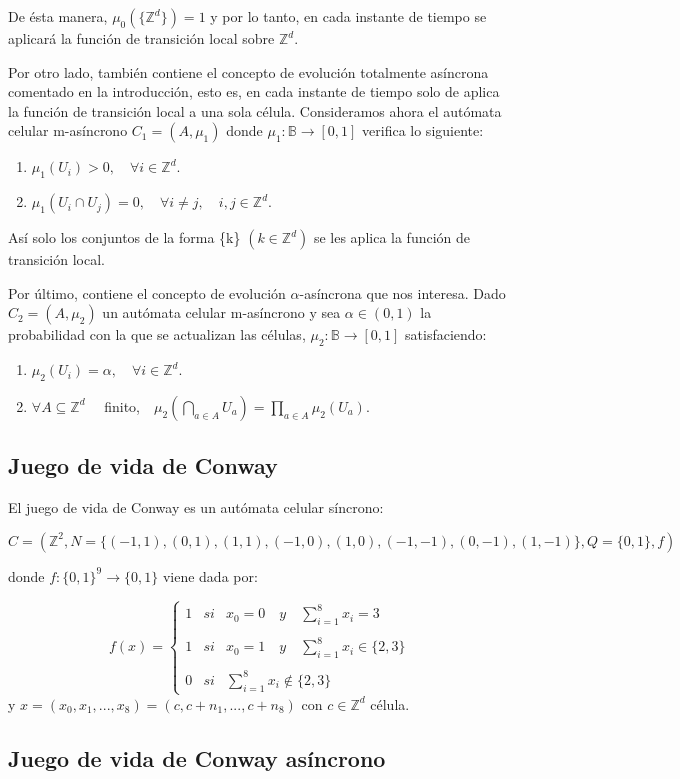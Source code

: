 \documentclass[../proyecto.tex]{memoir}
\begin{document}
De ésta manera, $\mu_{0}(\{\mathds{Z}^{d}\})=1$ y por lo tanto, en cada instante de tiempo se aplicará la función de transición local sobre $\mathds{Z}^{d}$.

Por otro lado, también contiene el concepto de evolución totalmente asíncrona comentado en la introducción, esto es, en cada instante de tiempo solo de aplica la función de transición local a una sola célula. Consideramos ahora el autómata celular m-asíncrono $C_{1}=(A, \mu_{1})$ donde $\mu_{1}: \mathds{B} \rightarrow [0,1]$ verifica lo siguiente:

\begin{enumerate}
\item $\mu_{1}(U_{i}) > 0, \quad \forall i \in \mathds{Z}^{d}$.
\item $\mu_{1}(U_{i} \cap U_{j}) = 0, \quad \forall i \neq j, \quad i,j \in \mathds{Z}^{d}$.
\end{enumerate}

Así solo los conjuntos de la forma \{k\} $(k \in \mathds{Z}^{d})$ se les aplica la función de transición local.

Por último, contiene el concepto de evolución $\alpha$-asíncrona que nos interesa. Dado $C_{2}=(A, \mu_{2})$ un autómata celular m-asíncrono y sea $\alpha \in (0,1)$ la probabilidad con la que se actualizan las células, $\mu_{2}: \mathds{B} \rightarrow [0,1]$ satisfaciendo:

\begin{enumerate}
\item $\mu_{2}(U_{i}) = \alpha, \quad \forall i \in \mathds{Z}^{d}$.
\item $ \forall A \subseteq \mathds{Z}^{d} \quad$ finito,$\quad  \mu_{2} ( \bigcap_{a \in A} U_{a} ) = \prod_{a \in A} \mu_{2} ( U_{a} )$.
\end{enumerate}


\subsection{Juego de vida de Conway}

El juego de vida de Conway es un autómata celular síncrono:

\begin{equation}
C = (\mathds{Z}^{2} , N=\{(-1, 1), (0, 1), (1, 1), (-1, 0), (1, 0), (-1,-1), (0,-1), (1,-1) \}, Q=\{0,1\}, f)
\end{equation}
 
donde $f:\{0,1\}^{9} \rightarrow \{0,1\} $ viene dada por:

\begin{equation}
f(x)= \left\{ \begin{array}{lcc}
             1 &   si  & x_{0}=0 \quad y \quad \sum_{i=1}^{8} x_i = 3 \\
             \\ 1 & si & x_{0}=1 \quad y \quad \sum_{i=1}^{8} x_i \in \{2 ,3\} \\
             \\ 0 &  si  & \sum_{i=1}^{8} x_i \notin \{2, 3\} \
             \end{array}
   \right. 
\end{equation}
y $x = (x_{0}, x_{1}, ...,x_{8}) = (c,c+n_{1},...,c+n_{8})$ con $c \in \mathds{Z} ^{d}$ célula.


\subsection{Juego de vida de Conway asíncrono}
\end{document}
